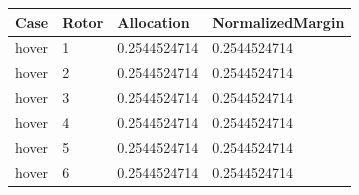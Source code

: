\begin{tabular}{@{}llll@{}}
\toprule
Case & Rotor & Allocation & NormalizedMargin \\
\midrule
hover & 1 & 0.2544524714 & 0.2544524714 \\
hover & 2 & 0.2544524714 & 0.2544524714 \\
hover & 3 & 0.2544524714 & 0.2544524714 \\
hover & 4 & 0.2544524714 & 0.2544524714 \\
hover & 5 & 0.2544524714 & 0.2544524714 \\
hover & 6 & 0.2544524714 & 0.2544524714 \\
\bottomrule
\end{tabular}
